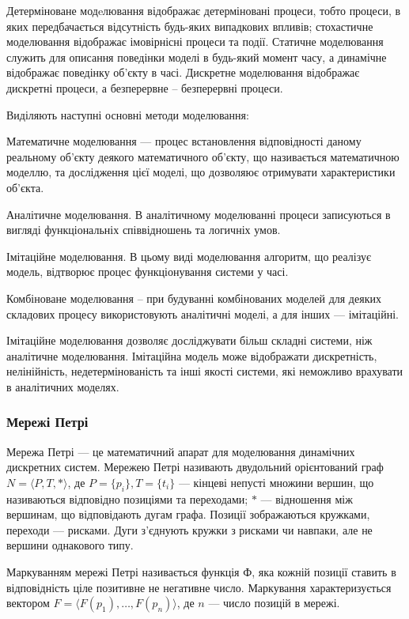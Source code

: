 Детерміноване модeлювання відображає детерміновані процеси, тобто процеси, в яких передбачається відсутність будь-яких випадкових впливів; стохастичне моделювання відображає імовірнісні процеси та події. Статичне моделювання служить для описання поведінки моделі в будь-який момент часу, а динамічне відображає поведінку об’єкту в часі. Дискретне моделювання відображає дискретні процеси, а безперервне -- безперервні процеси\cite{model}.

Виділяють наступні основні методи моделювання\cite{model}:
\begin{longEnumerate}
   \item Математичне моделювання --- процес встановлення відповідності даному реальному об’єкту деякого математичного об’єкту, що називається математичною моделлю, та дослідження цієї моделі, що дозволяює отримувати характеристики об’єкта. 
   \item Аналітичне моделювання. В аналітичному моделюванні процеси записуються в вигляді функціональніх співвідношень та логичніх умов.
   \item Імітаційне моделювання. В цьому виді моделювання алгоритм, що реалізує модель, відтворює процес функціонування системи у часі.
   \item Комбіноване моделювання -- при будуванні комбінованих моделей для деяких складових процесу використовують аналітичні моделі, а для інших --- імітаційні.
\end{longEnumerate}

Імітаційне моделювання дозволяє досліджувати більш складні системи, ніж аналітичне моделювання. Імітаційна модель може відображати дискретність, нелінійність, недетермінованість та інші якості системи, які неможливо врахувати в аналітичних моделях. 

\subsubsection{Мережі Петрі}
Мережа Петрі --- це математичний апарат для моделювання динамічних дискретних систем. Мережею Петрі називають двудольний орієнтований граф \mbox {$ N = \langle P, T, * \rangle $}, де \mbox{$ P = \{p_i\}, T = \{t_i\} $} --- кінцеві непусті множини вершин, що називаються відповідно позиціями та переходами; $*$ --- відношення між вершинам, що відповідають дугам графа. Позиції зображаються кружками, переходи --- рисками. Дуги з’єднують кружки з рисками чи навпаки, але не вершини однакового типу.

Маркуванням мережі Петрі називається функція $Ф$, яка кожній позиції ставить в відповідність ціле позитивне не негативне число. Маркування характеризується вектором \mbox{$ F = \langle F(p_1), \dots, F(p_n) \rangle $}, де $n$ --- число позицій в мережі.

